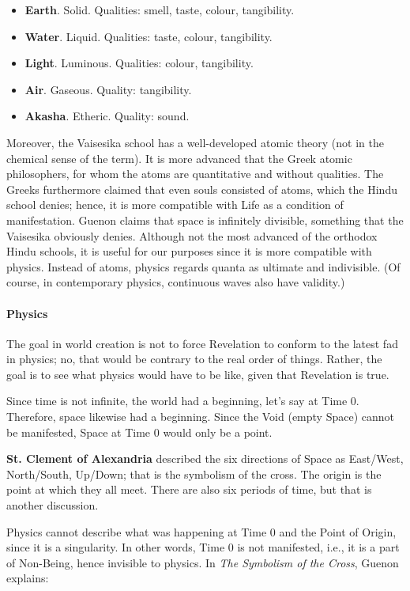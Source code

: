 \begin{itemize}
\item \textbf{Earth}. Solid. Qualities: smell, taste, colour, tangibility. 
\item \textbf{Water}. Liquid. Qualities: taste, colour, tangibility. 
\item \textbf{Light}. Luminous. Qualities: colour, tangibility. 
\item \textbf{Air}. Gaseous. Quality: tangibility. 
\item \textbf{Akasha}. Etheric. Quality: sound. 
\end{itemize}
Moreover, the Vaisesika school has a well-developed atomic theory (not in the chemical sense of the term). It is more advanced that the Greek atomic philosophers, for whom the atoms are quantitative and without qualities. The Greeks furthermore claimed that even souls consisted of atoms, which the Hindu school denies; hence, it is more compatible with Life as a condition of manifestation. Guenon claims that space is infinitely divisible, something that the Vaisesika obviously denies. Although not the most advanced of the orthodox Hindu schools, it is useful for our purposes since it is more compatible with physics. Instead of atoms, physics regards quanta as ultimate and indivisible. (Of course, in contemporary physics, continuous waves also have validity.)

\paragraph{Physics}
The goal in world creation is not to force Revelation to conform to the latest fad in physics; no, that would be contrary to the real order of things. Rather, the goal is to see what physics would have to be like, given that Revelation is true.

Since time is not infinite, the world had a beginning, let's say at Time 0. Therefore, space likewise had a beginning. Since the Void (empty Space) cannot be manifested, Space at Time 0 would only be a point.

\textbf{St. Clement of Alexandria} described the six directions of Space as East/West, North/South, Up/Down; that is the symbolism of the cross. The origin is the point at which they all meet. There are also six periods of time, but that is another discussion.

Physics cannot describe what was happening at Time 0 and the Point of Origin, since it is a singularity. In other words, Time 0 is not manifested, i.e., it is a part of Non-Being, hence invisible to physics. In \textit{The Symbolism of the Cross}, Guenon explains:

